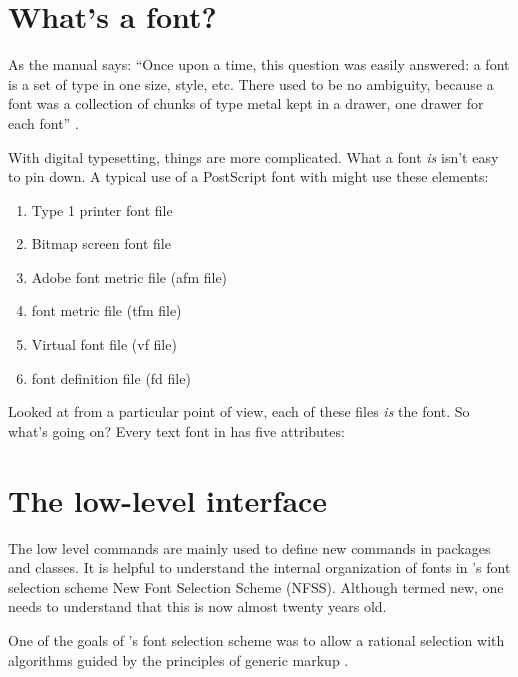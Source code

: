\section{What's a font?}

As the  manual says: ``Once upon a time, this question was easily answered: a font is a set of type
in one size, style, etc. There used to be no ambiguity, because a font was a
collection of chunks of type metal kept in a drawer, one drawer for each font'' \citet{fontinst}.


With digital typesetting, things are more complicated. What a font
\textit{is} isn't easy to pin down. A typical use of a PostScript font with \latex might
use these elements:

\begin{enumerate}
\item Type 1 printer font file
\item Bitmap screen font file
\item Adobe font metric file (afm file)
\item \tex font metric file (tfm file)
\item Virtual font file (vf file)
\item font definition file (fd file)
\end{enumerate}

Looked at from a particular point of view, each of these files \textit{is} the font. So
what’s going on? Every text font in \latex has five attributes:




\section{The low-level interface}

The low level commands are mainly  used to define new commands in packages and classes.
It is helpful to understand the internal organization of fonts in \latex's font selection
scheme New Font Selection Scheme (NFSS). Although termed new, one needs to understand
that this is now almost twenty years old.

One of the goals of \latex's font selection scheme was to allow a rational selection with
algorithms guided by the principles of generic markup \citep{companion}. 

